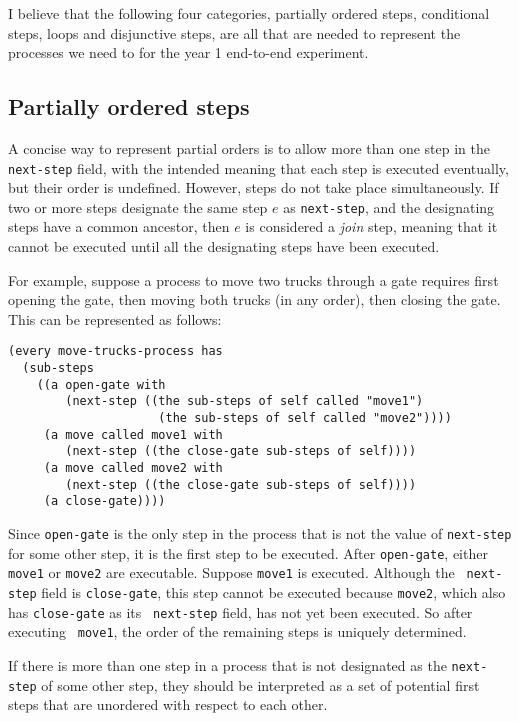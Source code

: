 \documentclass[fullpage]{article}
\begin{document}
I believe that the following four categories, partially ordered steps,
conditional steps, loops and disjunctive steps, are all that are
needed to represent the processes we need to for the year 1 end-to-end
experiment.

\subsection*{Partially ordered steps}

A concise way to represent partial orders is to allow more than one
step in the {\tt next-step} field, with the intended meaning that
each step is executed eventually, but their order is
undefined. However, steps do not take place simultaneously.  If two
or more steps designate the same step $e$ as {\tt next-step}, and
the designating steps have a common ancestor, then $e$ is considered
a {\em join} step, meaning that it cannot be executed until all the
designating steps have been executed.

For example, suppose a process to move two trucks through a gate
requires first opening the gate, then moving both trucks (in any order),
then closing the gate. This can be represented as follows:\\
{\small
\begin{verbatim}
(every move-trucks-process has
  (sub-steps 
    ((a open-gate with
        (next-step ((the sub-steps of self called "move1")
                     (the sub-steps of self called "move2"))))
     (a move called move1 with
        (next-step ((the close-gate sub-steps of self))))
     (a move called move2 with
        (next-step ((the close-gate sub-steps of self))))
     (a close-gate))))
\end{verbatim}
}

Since {\tt open-gate} is the only step in the process that is not the
value of {\tt next-step} for some other step, it is the first step to
be executed. After {\tt open-gate}, either {\tt move1} or {\tt move2}
are executable. Suppose {\tt move1} is executed. Although the {\tt
next-step} field is {\tt close-gate}, this step cannot be executed
because {\tt move2}, which also has {\tt close-gate} as its {\tt
next-step} field, has not yet been executed. So after executing {\tt
move1}, the order of the remaining steps is uniquely determined.

If there is more than one step in a process that is not designated as
the {\tt next-step} of some other step, they should be interpreted as
a set of potential first steps that are unordered with respect to each
other.
\end{document}
